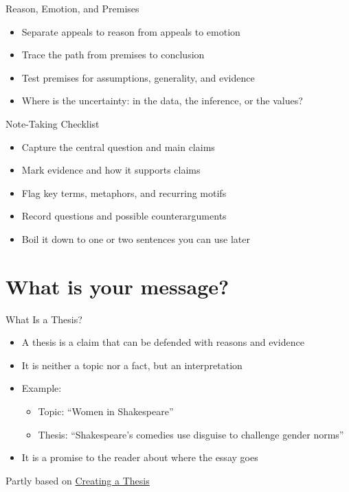 \documentclass[aspectratio=169]{beamer}
\begin{document}
\begin{frame}{Reason, Emotion, and Premises}
\begin{itemize}
  \item Separate appeals to reason from appeals to emotion
  \item Trace the path from premises to conclusion
  \item Test premises for assumptions, generality, and evidence
  \item Where is the uncertainty: in the data, the inference, or the values?
\end{itemize}
\end{frame}

\begin{frame}{Note-Taking Checklist}
\begin{itemize}
  \item Capture the central question and main claims
  \item Mark evidence and how it supports claims
  \item Flag key terms, metaphors, and recurring motifs
  \item Record questions and possible counterarguments
  \item Boil it down to one or two sentences you can use later
\end{itemize}
\end{frame}





\section{What is your message?}


\begin{frame}{What Is a Thesis?}
\begin{itemize}
  \item A thesis is a claim that can be defended with reasons and evidence
  \item It is neither a topic nor a fact, but an interpretation
  \item Example:
    \begin{itemize}
      \item Topic: “Women in Shakespeare”
      \item Thesis: “Shakespeare’s comedies use disguise to challenge gender norms”
    \end{itemize}
  \item It is a promise to the reader about where the essay goes
\end{itemize}
\vfill
Partly based on \href{https://mlpp.pressbooks.pub/writinghandbook/chapter/44/}{Creating a Thesis} \citep[Ch.~3]{writinghandbook}
\end{frame}
\end{document}
